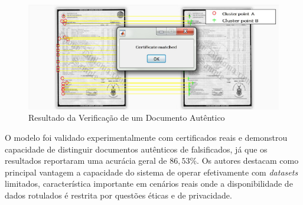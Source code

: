 \begin{figure}[H]
	\caption{\label{fig:clusterfraudverification}Resultado da Verificação de um Documento Autêntico}
    \begin{center}
    \includegraphics[width=1\linewidth]{images/clusterfraudverification.png}
	\end{center}
\end{figure}

O modelo foi validado experimentalmente com certificados reais e demonstrou capacidade de distinguir documentos autênticos de falsificados, já que os resultados reportaram uma acurácia geral de $86,53$\%. Os autores destacam como principal vantagem a capacidade do sistema de operar efetivamente com \textit{datasets} limitados, característica importante em cenários reais onde a disponibilidade de dados rotulados é restrita por questões éticas e de privacidade.